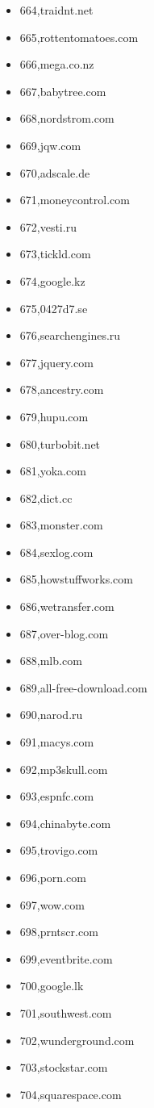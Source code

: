 \begin{multicols}{3}
\begin{itemize}
	\item 664,traidnt.net
	\item 665,rottentomatoes.com
	\item 666,mega.co.nz
	\item 667,babytree.com
	\item 668,nordstrom.com
	\item 669,jqw.com
	\item 670,adscale.de
	\item 671,moneycontrol.com
	\item 672,vesti.ru
	\item 673,tickld.com
	\item 674,google.kz
	\item 675,0427d7.se
	\item 676,searchengines.ru
	\item 677,jquery.com
	\item 678,ancestry.com
	\item 679,hupu.com
	\item 680,turbobit.net
	\item 681,yoka.com
	\item 682,dict.cc
	\item 683,monster.com
	\item 684,sexlog.com
	\item 685,howstuffworks.com
	\item 686,wetransfer.com
	\item 687,over-blog.com
	\item 688,mlb.com
	\item 689,all-free-download.com
	\item 690,narod.ru
	\item 691,macys.com
	\item 692,mp3skull.com
	\item 693,espnfc.com
	\item 694,chinabyte.com
	\item 695,trovigo.com
	\item 696,porn.com
	\item 697,wow.com
	\item 698,prntscr.com
	\item 699,eventbrite.com
	\item 700,google.lk
	\item 701,southwest.com
	\item 702,wunderground.com
	\item 703,stockstar.com
	\item 704,squarespace.com

\end{itemize}
\end{multicols}
